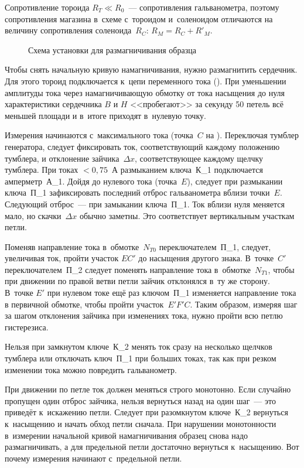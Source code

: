 Сопротивление тороида $R_T\ll R_0$~--- сопротивления гальванометра, поэтому сопротивления магазина в~схеме с~тороидом
и~соленоидом отличаются на величину сопротивления соленоида~$R_C$: $R_M = R_C + R'_M$.

\begin{wrapfigure}{r}{0.4\textwidth}
	\caption{Схема установки для размагничивания образца}
\end{wrapfigure}

Чтобы снять начальную кривую намагничивания, нужно размагнитить сердечник. Для этого тороид подключается к~цепи
переменного тока (). При уменьшении амплитуды тока через намагничивающую обмотку от тока насыщения до нуля
характеристики сердечника $B$ и $H$ <<пробегают>> за секунду 50 петель всё меньшей площади и в~итоге приходят в~нулевую
точку.


Измерения начинаются с~максимального тока (точка~$C$ на ). Переключая тумблер генератора,
следует фиксировать ток, соответствующий каждому положению тумблера, и отклонение зайчика~$\Delta x$, соответствующее
каждому щелчку тумблера. При токах $< 0,75$~А размыканием ключа~К\_1 подключается амперметр~А\_1. Дойдя до нулевого тока
(точка~$E$), следует при размыкании ключа~П\_1 зафиксировать последний отброс гальванометра вблизи точки~$E$. Следующий
отброс~--- при замыкании ключа~П\_1. Ток вблизи нуля меняется мало, но скачки~$\Delta x$ обычно заметны. Это соответствует
вертикальным участкам петли.

Поменяв направление тока в~обмотке~$N_{T0}$ переключателем~П\_1, следует, увеличивая ток, пройти участок $EC'$ до
насыщения другого знака. В~точке~$C'$ переключателем~П\_2 следует поменять направление тока в~обмотке~$N_{T1}$, чтобы при
движении по правой ветви петли зайчик отклонялся в~ту же сторону. В~точке $E'$ при нулевом токе ещё раз ключом~П\_1
изменяется направление тока в первичной обмотке, чтобы пройти участок~$E'F'C$. Таким образом, измеряя шаг за шагом
отклонения зайчика при изменениях тока, нужно пройти всю петлю гистерезиса.

Нельзя при замкнутом ключе~К\_2 менять ток сразу на несколько щелчков тумблера или отключать ключ~П\_1 при больших
токах, так как при резком изменении тока можно повредить гальванометр.

При движении по петле ток должен меняться строго монотонно. Если случайно пропущен один отброс зайчика, нельзя вернуться
назад на один шаг~--- это приведёт к~искажению петли. Следует при разомкнутом ключе~К\_2 вернуться к~насыщению и начать
обход петли сначала. При нарушении монотонности в~измерении начальной кривой намагничивания образец снова надо
размагничивать, а для предельной петли достаточно вернуться к~насыщению. Вот почему измерения начинают с~предельной
петли.


